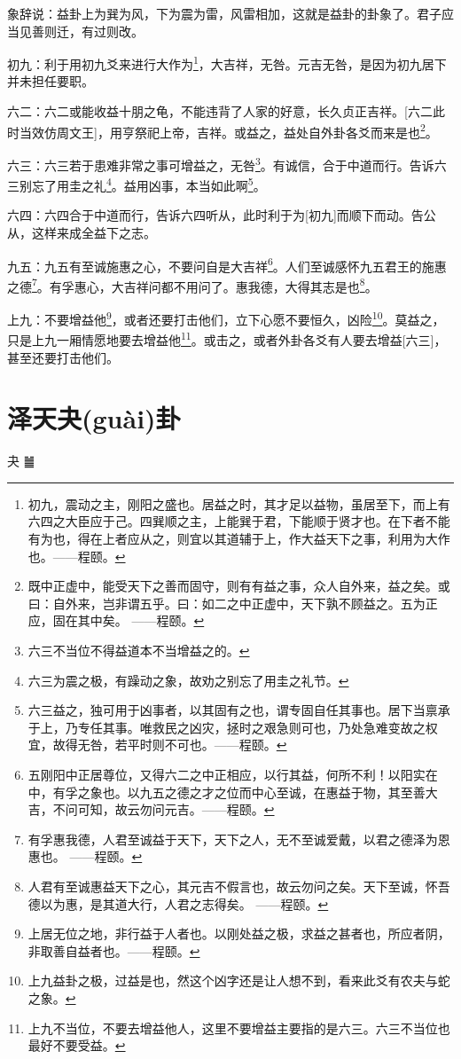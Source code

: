 \documentclass[12pt,oneside]{book}
\begin{document}
象辞说：益卦上为巽为风，下为震为雷，风雷相加，这就是益卦的卦象了。君子应当见善则迁，有过则改。

初九：利于用初九爻来进行大作为\footnote{初九，震动之主，刚阳之盛也。居益之时，其才足以益物，虽居至下，而上有六四之大臣应于己。四巽顺之主，上能巽于君，下能顺于贤才也。在下者不能有为也，得在上者应从之，则宜以其道辅于上，作大益天下之事，利用为大作也。——程颐。}，大吉祥，无咎。元吉无咎，是因为初九居下并未担任要职。

六二：六二或能收益十朋之龟，不能违背了人家的好意，长久贞正吉祥。[六二此时当效仿周文王]，用亨祭祀上帝，吉祥。或益之，益处自外卦各爻而来是也\footnote{既中正虚中，能受天下之善而固守，则有有益之事，众人自外来，益之矣。或曰：自外来，岂非谓五乎。曰：如二之中正虚中，天下孰不顾益之。五为正应，固在其中矣。 ——程颐。}。

六三：六三若于患难非常之事可增益之，无咎\footnote{六三不当位不得益道本不当增益之的。}。有诚信，合于中道而行。告诉六三别忘了用圭之礼\footnote{六三为震之极，有躁动之象，故劝之别忘了用圭之礼节。}。益用凶事，本当如此啊\footnote{六三益之，独可用于凶事者，以其固有之也，谓专固自任其事也。居下当禀承于上，乃专任其事。唯救民之凶灾，拯时之艰急则可也，乃处急难变故之权宜，故得无咎，若平时则不可也。——程颐。}。

六四：六四合于中道而行，告诉六四听从，此时利于为[初九]而顺下而动。告公从，这样来成全益下之志。

九五：九五有至诚施惠之心，不要问自是大吉祥\footnote{五刚阳中正居尊位，又得六二之中正相应，以行其益，何所不利！以阳实在中，有孚之象也。以九五之德之才之位而中心至诚，在惠益于物，其至善大吉，不问可知，故云勿问元吉。——程颐。}。人们至诚感怀九五君王的施惠之德\footnote{有孚惠我德，人君至诚益于天下，天下之人，无不至诚爱戴，以君之德泽为恩惠也。 ——程颐。}。有孚惠心，大吉祥问都不用问了。惠我德，大得其志是也\footnote{人君有至诚惠益天下之心，其元吉不假言也，故云勿问之矣。天下至诚，怀吾德以为惠，是其道大行，人君之志得矣。 ——程颐。}。

上九：不要增益他\footnote{上居无位之地，非行益于人者也。以刚处益之极，求益之甚者也，所应者阴，非取善自益者也。——程颐。}，或者还要打击他们，立下心愿不要恒久，凶险\footnote{上九益卦之极，过益是也，然这个凶字还是让人想不到，看来此爻有农夫与蛇之象。}。莫益之，只是上九一厢情愿地要去增益他\footnote{上九不当位，不要去增益他人，这里不要增益主要指的是六三。六三不当位也最好不要受益。}。或击之，或者外卦各爻有人要去增益[六三]，甚至还要打击他们。



\chapter{泽天夬(guài)卦}
夬 {\Large ䷪}
\end{document}
